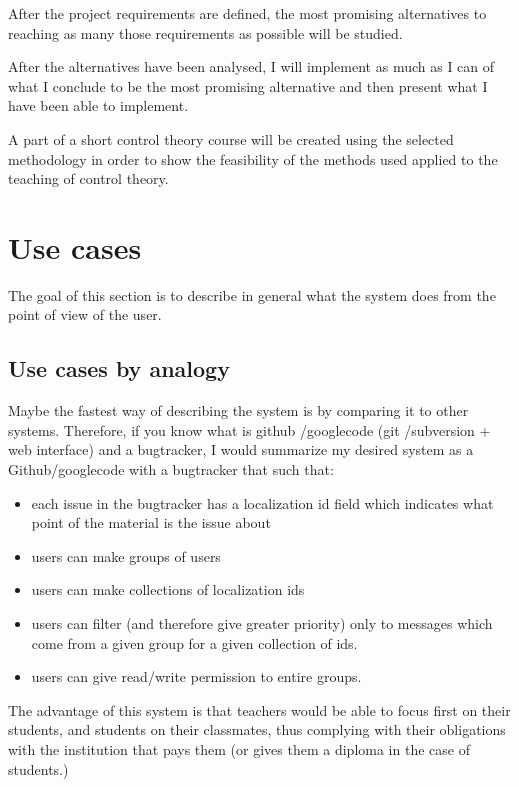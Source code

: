 \documentclass[12pt]{article}
\begin{document}
After the project requirements are defined, the most promising alternatives to reaching as many those requirements as possible will be studied.

After the alternatives have been analysed, I will implement as much as I can of what I conclude to be the most promising alternative and then present what I have been able to implement.

A part of a short control theory course will be created using the selected methodology in order to show the feasibility of the methods used applied to the teaching of control theory.

\section{Use cases} \label{use-cases}

The goal of this section is to describe in general what the system does from the point of view of the user.

\subsection{Use cases by analogy} \label{use-cases-analogy}

Maybe the fastest way of describing the system is by comparing it to other systems. Therefore, if you know what is github \cite{Gi12}/googlecode\cite{Go12} (git \cite{git}/subversion \cite{svn} + web interface) and a bugtracker, I would summarize my desired system as a Github/googlecode with a bugtracker that such that:

\begin{itemize}
  \item each issue in the bugtracker has a localization id field which indicates what point of the material is the issue about
  \item users can make groups of users
  \item users can make collections of localization ids
  \item users can filter (and therefore give greater priority) only to messages which come from a given group for a given collection of ids.
  \item users can give read/write permission to entire groups.
\end{itemize}

The advantage of this system is that teachers would be able to focus first on their students, and students on their classmates, thus complying with their obligations with the institution that pays them (or gives them a diploma in the case of students.)
\end{document}
